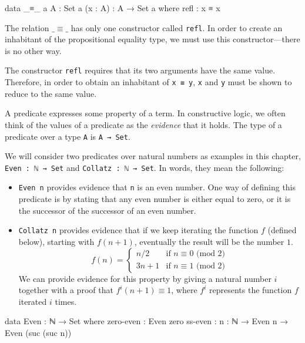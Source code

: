 \begin{listing}[h]
\begin{agdacode}
data _≡_ {a} {A : Set a} (x : A) : A → Set a where
  refl : x ≡ x
\end{agdacode}
\end{listing}

The relation \(\_\!\!\equiv\!\!\_\) has only one constructor called \texttt{refl}. In order to create an inhabitant of the propositional equality type, we must use this constructor---there is no other way.

The constructor \texttt{refl} requires that its two arguments have the same value. Therefore, in order to obtain an inhabitant of \texttt{x ≡ y}, \texttt{x} and \texttt{y} must be shown to reduce to the same value.


A predicate expresses some property of a term. In constructive logic, we often think of the values of a predicate as the \emph{evidence} that it holds. The type of a predicate over a type \texttt{A} is \texttt{A → Set}.

We will consider two predicates over natural numbers as examples in this chapter, \texttt{Even : ℕ → Set} and \texttt{Collatz : ℕ → Set}. In words, they mean the following:
\begin{itemize}
\item \texttt{Even n} provides evidence that \texttt{n} is an even number. One way of defining this predicate is by stating that any even number is either equal to zero, or it is the successor of the successor of an even number.
\item \texttt{Collatz n} provides evidence that if we keep iterating the function \(f\) (defined below), starting with \(f (n + 1)\), eventually the result will be the number \(1\).
\[ f(n) =
	\begin{cases}
		n/2    & \text{if } n \equiv 0 \text{ (mod \(2\))} \\
		3n + 1 & \text{if } n \equiv 1 \text{ (mod \(2\))}
	\end{cases}
\]
We can provide evidence for this property by giving a natural number \(i\) together with a proof that \(f^i(n+1) \equiv 1\), where \(f^i\) represents the function \(f\) iterated \(i\) times.
\end{itemize}

\begin{listing}[h]
\begin{agdacode}
data Even : ℕ → Set where
  zero-even : Even zero
  ss-even   : {n : ℕ} → Even n → Even (suc (suc n))
\end{agdacode}
\end{listing}

